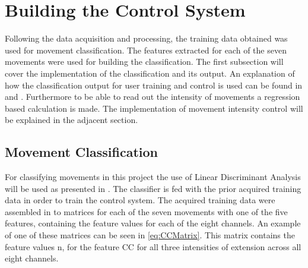 \section{Building the Control System}

Following the data acquisition and processing, the training data obtained was used for movement classification. The features extracted for each of the seven movements were used for building the classification. The first subsection will cover the implementation of the classification and its output. An explanation of how the classification output for user training and control is used can be found in  and . Furthermore to be able to read out the intensity of movements a regression based calculation is made. The implementation of movement intensity control will be explained in the adjacent section.   


\subsection{Movement Classification}

For classifying movements in this project the use of Linear Discriminant Analysis will be used as presented in . The classifier is fed with the prior acquired training data in order to train the control system.  
The acquired training data were assembled in to matrices for each of the seven movements with one of the five features, containing the feature values for each of the eight channels. An example of one of these matrices can be seen in \eqref{eq:CCMatrix}. This matrix contains the feature values n, for the feature CC for all three intensities of extension across all eight channels.  

